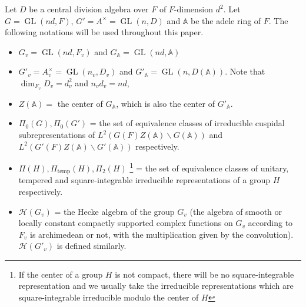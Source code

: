 \documentclass[11pt]{article}
\theoremstyle{plain}
\theoremstyle{remark}
\theoremstyle{definition}
\DeclareMathOperator{\GL}{GL}
\DeclareMathOperator{\tp}{temp}
\begin{document}
Let $D$ be a central division algebra over $F$ of $F$-dimension $d^2$. 
Let $G=\GL(nd,F)$, $G'=A^{\times}=\GL(n,D)$ and $\mathbb{A}$ be the adele ring of $F$. The following notations will be used throughout this paper.
\begin{itemize}
    \item $G_v=\GL(nd,F_v)$ and $G_{\mathbb{A}}=\GL(nd,\mathbb{A})$
    \item $G'_v=A_v^{\times}=\GL(n_v,D_v)$ and $G'_{\mathbb{A}}=\GL(n,D(\mathbb{A}))$. Note that $\dim_{F_v}D_v=d_v^2$ and $n_v d_v =nd$,  
    \item $Z(\mathbb{A})=$ the center of $G_{\mathbb{A}}$, which is also the center of $G'_{\mathbb{A}}$.  
    \item $\Pi_{0}(G),\Pi_{0}(G')$ = the set of equivalence classes of irreducible cuspidal subrepresentations of $L^2(G(F)Z(\mathbb{A})\backslash
    G(\mathbb{A}))$ and $L^2(G'(F)Z(\mathbb{A})\backslash
    G'(\mathbb{A}))$ respectively. 
    \item $\Pi(H),\Pi_{\tp}(H),\Pi_{2}(H)$ \footnote{If the center of a group $H$ is not compact, there will be no square-integrable representation and we usually take the irreducible representations which are square-integrable irreducible modulo the center of $H$} = the set of equivalence classes of unitary, tempered and square-integrable irreducible representations of a group $H$ respectively. 
    \item $\mathcal{H}(G_v)$ = the Hecke algebra of the group $G_v$ (the algebra of smooth or locally constant compactly supported complex functions on $G_v$ according to $F_v$ is archimedean or not, with the multiplication given by the convolution). 
    $\mathcal{H}(G'_v)$ is defined similarly. 
\end{itemize}
\end{document}
